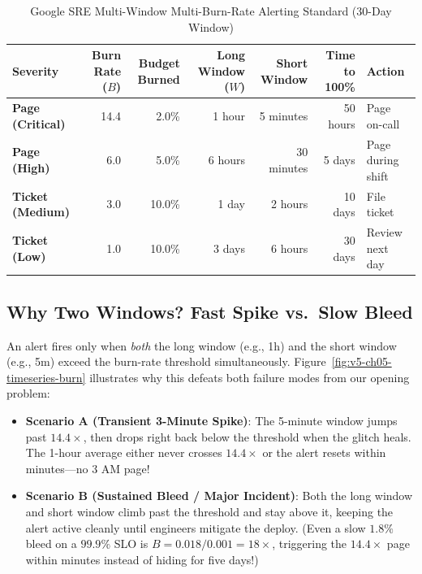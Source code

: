 \begin{table}[htbp]
\centering\small
\begin{tabular}{lrrrrrl}
\toprule
\textbf{Severity} & \textbf{Burn Rate ($B$)} & \textbf{Budget Burned} & \textbf{Long Window ($W$)} & \textbf{Short Window} & \textbf{Time to 100\%} & \textbf{Action} \\
\midrule
\textbf{Page (Critical)} & 14.4 & 2.0\% & 1 hour & 5 minutes & 50 hours & Page on-call \\
\textbf{Page (High)} & 6.0 & 5.0\% & 6 hours & 30 minutes & 5 days & Page during shift \\
\textbf{Ticket (Medium)} & 3.0 & 10.0\% & 1 day & 2 hours & 10 days & File ticket \\
\textbf{Ticket (Low)} & 1.0 & 10.0\% & 3 days & 6 hours & 30 days & Review next day \\
\bottomrule
\end{tabular}
\caption{Google SRE Multi-Window Multi-Burn-Rate Alerting Standard (30-Day Window)}
\label{tab:v5-ch05-burn-rate}
\end{table}

\subsection{Why Two Windows? Fast Spike vs.\ Slow Bleed}

An alert fires only when \emph{both} the long window (e.g., 1h) and the short window (e.g., 5m) exceed the burn-rate threshold simultaneously. Figure~\ref{fig:v5-ch05-timeseries-burn} illustrates why this defeats both failure modes from our opening problem:
\begin{itemize}[leftmargin=18pt]
  \item \textbf{Scenario A (Transient 3-Minute Spike)}: The 5-minute window jumps past $14.4\times$, then drops right back below the threshold when the glitch heals. The 1-hour average either never crosses $14.4\times$ or the alert resets within minutes---no 3 AM page!
  \item \textbf{Scenario B (Sustained Bleed / Major Incident)}: Both the long window and short window climb past the threshold and stay above it, keeping the alert active cleanly until engineers mitigate the deploy. (Even a slow $1.8\%$ bleed on a $99.9\%$ SLO is $B = 0.018 / 0.001 = 18\times$, triggering the $14.4\times$ page within minutes instead of hiding for five days!)
\end{itemize}

